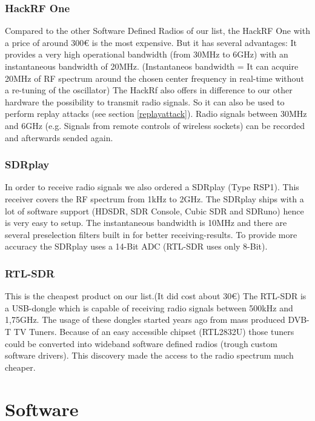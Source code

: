 \documentclass[conference]{IEEEtran}
\begin{document}
\subsubsection{HackRF One}
Compared to the other Software Defined Radios of our list, the HackRF One with a price of around 300€ is the most expensive. But it has several advantages: It provides a very high operational bandwidth (from 30MHz to 6GHz) with an instantaneous bandwidth of 20MHz. (Instantaneos bandwidth = It can acquire 20MHz of RF spectrum around the chosen center frequency in real-time without a re-tuning of the oscillator) \cite[2.5]{Mishra2014} The HackRf also offers in difference to our other hardware the possibility to transmit radio signals. So it can also be used to perform replay attacks (see section \ref{replayattack}). Radio signals between 30MHz and 6GHz (e.g. Signals from remote controls of wireless sockets) can be recorded and afterwards sended again.  \\

\subsubsection{SDRplay}
In order to receive radio signals we also ordered a SDRplay (Type RSP1). This receiver covers the RF spectrum from 1kHz to 2GHz. The SDRplay ships with  a lot of software support (HDSDR, SDR Console, Cubic SDR and SDRuno) hence is very easy to setup. The instantaneous bandwidth is 10MHz and there are several preselection filters built in for better receiving-results. To provide more accuracy the SDRplay uses a 14-Bit ADC (RTL-SDR uses only 8-Bit).
\cite{sdrplay}
\\
\subsubsection{RTL-SDR}
This is the cheapest product on our list.(It did cost about 30€) The RTL-SDR is a USB-dongle which is capable of receiving radio signals  between 500kHz and 1,75GHz.  The  usage of these dongles started years ago from mass produced DVB-T TV Tuners. Because of an easy accessible chipset (RTL2832U) those tuners could be converted into wideband software defined radios (trough custom software drivers). This discovery made the access to the radio spectrum much cheaper. \cite{rtl-sdr}



\section{Software} %
\end{document}
